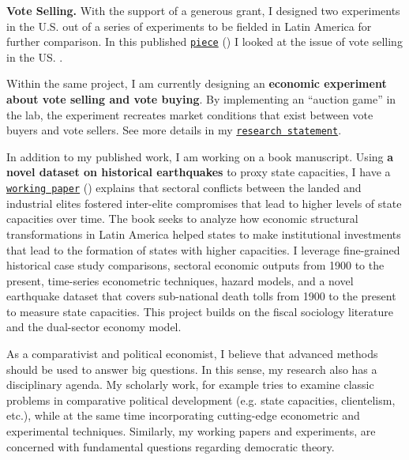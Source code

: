 {\bf Vote Selling.} With the support of a generous grant, I designed two experiments in the U.S. out of a series of experiments to be fielded in Latin America for further comparison. In this published \href{https://github.com/hbahamonde/Vote_Selling/raw/master/Bahamonde_VoteSellingUS.pdf}{\texttt{piece}} (\emph{\unskip}) I looked at the issue of vote selling in the US. .

Within the same project, I am currently designing an {\bf economic experiment about vote selling and vote buying}. By implementing an ``auction game'' in the lab, the experiment recreates market conditions that exist between vote buyers and vote sellers. See more details in my \href{http://github.com/hbahamonde/Job_Market/raw/master/Bahamonde_Research_Statement.pdf}{\texttt{research statement}}.


In addition to my published work, I am working on a book manuscript. Using {\bf a novel dataset on historical earthquakes} to proxy state capacities, I have a \href{https://github.com/hbahamonde/Earthquake_Paper/raw/master/Bahamonde_Earthquake_Paper.pdf}{\texttt{working paper}} (\emph{\unskip}) explains that sectoral conflicts between the landed and industrial elites fostered inter-elite compromises that lead to higher levels of state capacities over time. The book seeks to analyze how economic structural transformations in Latin America helped states to make institutional investments that lead to the formation of states with higher capacities. I leverage fine-grained historical case study comparisons, sectoral economic outputs from 1900 to the present, time-series econometric techniques, hazard models, and a novel earthquake dataset that covers sub-national death tolls from 1900 to the present to measure state capacities. This project builds on the fiscal sociology literature and the dual-sector economy model. 


As a comparativist and political economist, I believe that advanced methods should be used to answer big questions. In this sense, my research also has a disciplinary agenda. My scholarly work, for example tries to examine classic problems in comparative political development (e.g. state capacities, clientelism, etc.), while at the same time incorporating cutting-edge econometric and experimental techniques. Similarly, my working papers and experiments, are concerned with fundamental questions regarding democratic theory.